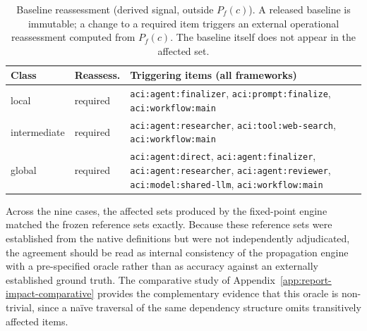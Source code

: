 \documentclass[10pt]{article}
\begin{document}
\begin{table}[htbp]
	\centering
	\caption{Baseline reassessment (derived signal, outside $P_f(c)$). A
		released baseline is immutable; a change to a required item triggers an
		external operational reassessment computed from $P_f(c)$. The baseline
		itself does not appear in the affected set.}
	\label{tab:app-impact-reassessment}
	\small
	\begin{tabularx}{\columnwidth}{@{}llX@{}}
		\toprule
		\textbf{Class} & \textbf{Reassess.} & \textbf{Triggering items (all frameworks)} \\
		\midrule
		local & required &
		\texttt{aci:agent:finalizer}, \texttt{aci:prompt:finalize},
		\texttt{aci:workflow:main} \\
		intermediate & required &
		\texttt{aci:agent:researcher}, \texttt{aci:tool:web-search},
		\texttt{aci:workflow:main} \\
		global & required &
		\texttt{aci:agent:direct}, \texttt{aci:agent:finalizer},
		\texttt{aci:agent:researcher}, \texttt{aci:agent:reviewer},
		\texttt{aci:model:shared-llm}, \texttt{aci:workflow:main} \\
		\bottomrule
	\end{tabularx}
\end{table}

Across the nine cases, the affected sets produced by the fixed-point
engine matched the frozen reference sets exactly. Because these reference sets were established from the native definitions but were not
independently adjudicated, the agreement should be read as internal
consistency of the propagation engine with a pre-specified oracle rather
than as accuracy against an externally established ground truth. The
comparative study of Appendix~\ref{app:report-impact-comparative}
provides the complementary evidence that this oracle is non-trivial,
since a na\"ive traversal of the same dependency structure omits
transitively affected items.




\end{document}
